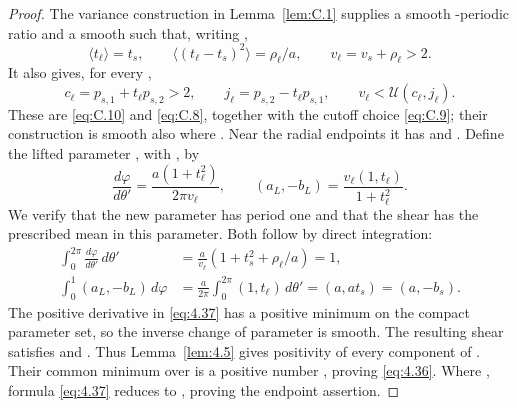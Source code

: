 \begin{proof}
The variance construction in Lemma~\ref{lem:C.1} supplies a smooth
-periodic ratio
 and a smooth
 such that, writing
,
\[
\langle t_\ell\rangle=t_s,
\qquad
\langle(t_\ell-t_s)^2\rangle=\rho_\ell/a,
\qquad
v_\ell=v_s+\rho_\ell>2.
\]
It also gives, for every ,
\[
c_\ell=p_{s,1}+t_\ell p_{s,2}>2,
\qquad
j_\ell=p_{s,2}-t_\ell p_{s,1},
\qquad
v_\ell<\mathcal U(c_\ell,j_\ell).
\]
These are \eqref{eq:C.10} and \eqref{eq:C.8}, together with the cutoff choice
\eqref{eq:C.9}; their construction is smooth also where
. Near the radial endpoints it has
 and . Define the lifted
parameter , with
, by
\begin{equation}
\frac{d\varphi}{d\theta'}=\frac{a(1+t_\ell^2)}{2\pi v_\ell},
\qquad
(a_L,-b_L)=\frac{v_\ell(1,t_\ell)}{1+t_\ell^2}.
\tag{4.37}\label{eq:4.37}
\end{equation}
We verify that the new parameter has period one and that the shear has the prescribed mean in
this parameter. Both follow by direct integration:
\begin{align*}
\int_0^{2\pi}\frac{d\varphi}{d\theta'}\,d\theta'
   &=\frac a{v_\ell}(1+t_s^2+\rho_\ell/a)=1,\\
\int_0^1(a_L,-b_L)\,d\varphi
   &=\frac a{2\pi}\int_0^{2\pi}(1,t_\ell)\,d\theta'
     =(a,at_s)=(a,-b_s).
\end{align*}
The positive derivative in \eqref{eq:4.37} has a positive minimum on the compact parameter set,
so the inverse change of parameter is smooth. The resulting shear satisfies
 and
. Thus Lemma~\ref{lem:4.5} gives positivity of every
component of . Their common minimum over
 is a positive number
, proving \eqref{eq:4.36}. Where
, formula \eqref{eq:4.37} reduces to
, proving the endpoint assertion.
\end{proof}

